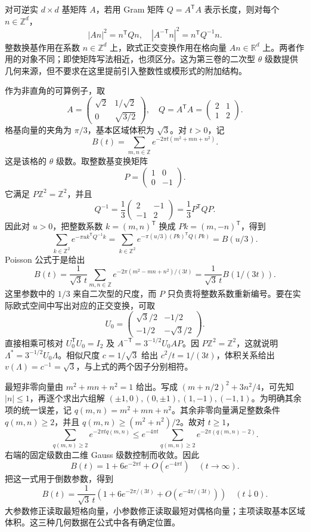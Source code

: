 对可逆实 \(d\times d\) 基矩阵 \(A\)，若用 Gram 矩阵 \(Q=A^{\mathsf T}A\) 表示长度，则对每个 \(n\in\mathbb Z^d\)，
\[
 |An|^2=n^{\mathsf T}Qn,
 \quad |A^{-\mathsf T}n|^2=n^{\mathsf T}Q^{-1}n.
\]
整数换基作用在系数 \(n\in\mathbb Z^d\) 上，欧式正交变换作用在格向量 \(An\in\mathbb R^d\) 上。两者作用的对象不同；即使矩阵写法相近，也须区分。这为第三卷的二次型 \(\theta\) 级数提供几何来源，但不要求在这里提前引入整数性或模形式的附加结构。

\ProseParagraphBreak

作为非直角的可算例子，取
\[
 A=\begin{pmatrix}\sqrt2&1/\sqrt2\\0&\sqrt{3/2}\end{pmatrix},
 \quad Q=A^{\mathsf T}A=\begin{pmatrix}2&1\\1&2\end{pmatrix}.
\]
格基向量的夹角为 \(\pi/3\)，基本区域体积为 \(\sqrt3\)。对 \(t>0\)，记
\[
 B(t)=\sum_{m,n\in\mathbb Z}e^{-2\pi t(m^2+mn+n^2)}.
\]
这是该格的 \(\theta\) 级数。取整数基变换矩阵
\[
 P=\begin{pmatrix}1&0\\0&-1\end{pmatrix}.
\]
它满足 \(P\mathbb Z^2=\mathbb Z^2\)，并且
\[
 Q^{-1}=\frac13\begin{pmatrix}2&-1\\-1&2\end{pmatrix}
 =\frac13P^{\mathsf T}QP.
\]
因此对 \(u>0\)，把整数系数 \(k=(m,n)^{\mathsf T}\) 换成 \(Pk=(m,-n)^{\mathsf T}\)，得到
\[
 \sum_{k\in\mathbb Z^2}e^{-\pi u k^{\mathsf T}Q^{-1}k}
 =\sum_{k\in\mathbb Z^2}e^{-\pi(u/3)(Pk)^{\mathsf T}Q(Pk)}
 =B(u/3).
\]
Poisson 公式于是给出
\[
 B(t)=\frac1{\sqrt3\,t}
 \sum_{m,n\in\mathbb Z}e^{-2\pi(m^2-mn+n^2)/(3t)}
 =\frac1{\sqrt3\,t}B(1/(3t)).
\]
这里参数中的 \(1/3\) 来自二次型的尺度，而 \(P\) 只负责将整数系数重新编号。要在实际欧式空间中写出对应的正交变换，可取
\[
 U_0=\begin{pmatrix}\sqrt3/2&-1/2\\-1/2&-\sqrt3/2\end{pmatrix}.
\]
直接相乘可核对 \(U_0^{\mathsf T}U_0=I_2\) 及 \(A^{-\mathsf T}=3^{-1/2}U_0AP\)。因 \(P\mathbb Z^2=\mathbb Z^2\)，这就说明 \(\Lambda^*=3^{-1/2}U_0\Lambda\)。相似尺度 \(c=1/\sqrt3\) 给出 \(c^2/t=1/(3t)\)，体积关系给出 \(v(\Lambda)=c^{-1}=\sqrt3\)，与上式的两个因子分别相符。

\ProseParagraphBreak

最短非零向量由 \(m^2+mn+n^2=1\) 给出。写成 \((m+n/2)^2+3n^2/4\)，可先知 \(|n|\leq1\)，再逐个求出六组解 \((\pm1,0),(0,\pm1),(1,-1),(-1,1)\)。为明确其余项的统一误差，记 \(q(m,n)=m^2+mn+n^2\)。其余非零向量满足整数条件 \(q(m,n)\geq2\)，并且 \(q(m,n)\geq(m^2+n^2)/2\)。故对 \(t\geq1\)，
\[
 \sum_{q(m,n)\geq2}e^{-2\pi t q(m,n)}
 \leq e^{-4\pi t}\sum_{q(m,n)\geq2}e^{-2\pi(q(m,n)-2)}.
\]
右端的固定级数由二维 Gauss 级数控制而收敛。因此
\[
 B(t)=1+6e^{-2\pi t}+O(e^{-4\pi t})\quad(t\to\infty).
\]
把这一式用于倒数参数，得到
\[
 B(t)=\frac1{\sqrt3\,t}
 \left(1+6e^{-2\pi/(3t)}+O(e^{-4\pi/(3t)})\right)
 \quad(t\downarrow0).
\]
大参数修正读取最短格向量，小参数修正读取最短对偶格向量；主项读取基本区域体积。这三种几何数据在公式中各有确定位置。
